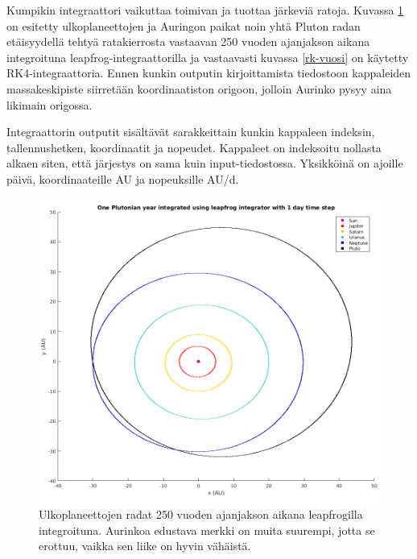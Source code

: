 \documentclass[12pt,a4paper,titlepage]{article}
\begin{document}
Kumpikin integraattori vaikuttaa toimivan ja tuottaa järkeviä ratoja. Kuvassa \ref{lf-vuosi} on esitetty ulkoplaneettojen ja Auringon paikat noin yhtä Pluton radan etäisyydellä tehtyä ratakierrosta vastaavan 250 vuoden ajanjakson aikana integroituna leapfrog-integraattorilla ja vastaavasti kuvassa \ref{rk-vuosi} on käytetty RK4-integraattoria. Ennen kunkin outputin kirjoittamista tiedostoon kappaleiden massakeskipiste siirretään koordinaatiston origoon, jolloin Aurinko pysyy aina likimain origossa.

Integraattorin outputit sisältävät sarakkeittain kunkin kappaleen indeksin, tallennushetken, koordinaatit ja nopeudet. Kappaleet on indeksoitu nollasta alkaen siten, että järjestys on sama kuin input-tiedostossa. Yksikköinä on ajoille päivä, koordinaateille AU ja nopeuksille AU/d.

\begin{figure}
\centering
\includegraphics[width=\textwidth]{../plots/vuosi-leapfrog-cut.png}
\caption{Ulkoplaneettojen radat 250 vuoden ajanjakson aikana leapfrogilla integroituna. Aurinkoa edustava merkki on muita suurempi, jotta se erottuu, vaikka sen liike on hyvin vähäistä.}
\label{lf-vuosi}
\end{figure}
\end{document}
